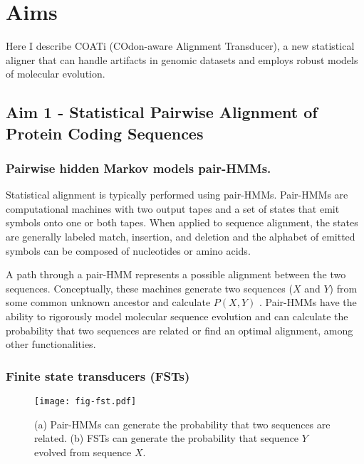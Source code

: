 \section{Aims}
Here I describe COATi (COdon-aware Alignment Transducer), a new statistical
aligner that can handle artifacts in genomic datasets and employs robust models
of molecular evolution.

\subsection{Aim 1 - Statistical Pairwise Alignment of Protein Coding Sequences}

\subsubsection{Pairwise hidden Markov models pair-HMMs.}
Statistical alignment is typically performed using pair-HMMs.
Pair-HMMs are computational machines with two output tapes and a set of states
that emit symbols onto one or both tapes.
When applied to sequence alignment, the states are generally labeled match,
insertion, and deletion and the alphabet of emitted symbols can be composed of
nucleotides or amino acids.

A path through a pair-HMM represents a possible alignment between the two
sequences.
Conceptually, these machines generate two sequences ($X$ and $Y$) from some
common unknown ancestor and calculate $P(X,Y)$
\parencite{yoon_2009_hmm}.
Pair-HMMs have the ability to rigorously model molecular sequence evolution and
can calculate the probability that two sequences are related or find an optimal
alignment, among other functionalities.

\subsubsection{Finite state transducers (FSTs)}

\begin{wrapfigure}[16]{r}{0.35\textwidth}
\vspace{-2em}
\centering
\begin{framed}
    \texttt{[image: fig-fst.pdf]}
    \caption{(a) Pair-HMMs can generate the probability that two sequences are
             related. (b) FSTs can generate the probability that sequence $Y$
             evolved from sequence $X$.}
    \label{fig:fst}
\end{framed}
\end{wrapfigure}

